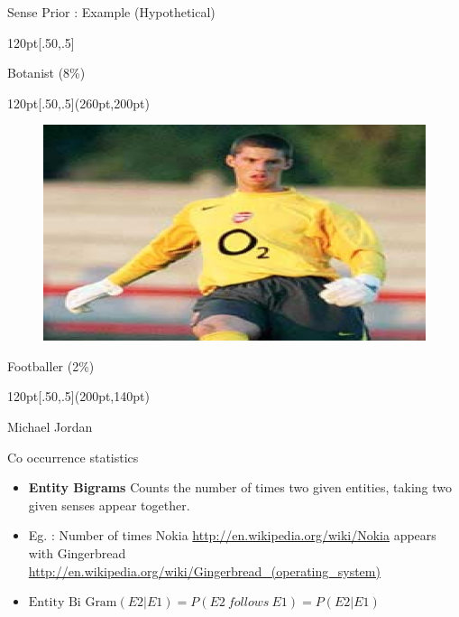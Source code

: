 \documentclass{beamer}
\begin{document}
\begin{frame}{Sense Prior : Example (Hypothetical)}
\begin{textblock*}{120pt}[.50,.5]
\begin{figure}[h]
\end{figure}
\centering
Botanist (8\%)
\end{textblock*}
  \begin{textblock*}{120pt}[.50,.5](260pt,200pt)
  \begin{figure}[h]
 \includegraphics[bb=0 0 200 150, scale=0.16]{./footballer.jpg}
\end{figure}
\centering
Footballer (2\%)
\end{textblock*}
  \begin{textblock*}{120pt}[.50,.5](200pt,140pt)

\large{Michael Jordan}

\end{textblock*}

\end{frame}

\begin{frame}{Co occurrence statistics}
\begin{itemize}
 \item \textbf{Entity Bigrams} Counts the number of times two given entities, taking two given senses appear together. \medskip
\item Eg. : Number of times Nokia \url{http://en.wikipedia.org/wiki/Nokia} appears with Gingerbread \url{http://en.wikipedia.org/wiki/Gingerbread_(operating_system)} \medskip


 \item $\text{Entity Bi Gram}(E2|E1) = P (E2\ follows\ E1) = P (E2|E1)$
 \end{itemize}
\end{frame}
\end{document}
